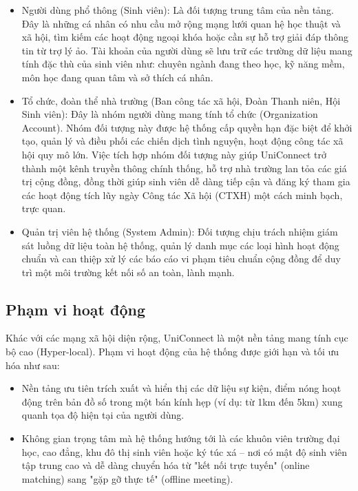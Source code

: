 \begin{itemize}
    \item Người dùng phổ thông (Sinh viên): Là đối tượng trung tâm của nền tảng. Đây là những cá nhân có nhu cầu mở rộng mạng lưới quan hệ học thuật và xã hội, tìm kiếm các hoạt động ngoại khóa hoặc cần sự hỗ trợ giải đáp thông tin từ trợ lý ảo. Tài khoản của người dùng sẽ lưu trữ các trường dữ liệu mang tính đặc thù của sinh viên như: chuyên ngành đang theo học, kỹ năng mềm, môn học đang quan tâm và sở thích cá nhân.

    \item Tổ chức, đoàn thể nhà trường (Ban công tác xã hội, Đoàn Thanh niên, Hội Sinh viên): Đây là nhóm người dùng mang tính tổ chức (Organization Account). Nhóm đối tượng này được hệ thống cấp quyền hạn đặc biệt để khởi tạo, quản lý và điều phối các chiến dịch tình nguyện, hoạt động công tác xã hội quy mô lớn. Việc tích hợp nhóm đối tượng này giúp UniConnect trở thành một kênh truyền thông chính thống, hỗ trợ nhà trường lan tỏa các giá trị cộng đồng, đồng thời giúp sinh viên dễ dàng tiếp cận và đăng ký tham gia các hoạt động tích lũy ngày Công tác Xã hội (CTXH) một cách minh bạch, trực quan.

    \item Quản trị viên hệ thống (System Admin): Đối tượng chịu trách nhiệm giám sát luồng dữ liệu toàn hệ thống, quản lý danh mục các loại hình hoạt động chuẩn và can thiệp xử lý các báo cáo vi phạm tiêu chuẩn cộng đồng để duy trì một môi trường kết nối số an toàn, lành mạnh.
\end{itemize}

\subsection{Phạm vi hoạt động}

Khác với các mạng xã hội diện rộng, UniConnect là một nền tảng mang tính cục bộ cao (Hyper-local). Phạm vi hoạt động của hệ thống được giới hạn và tối ưu hóa như sau\cite{schmidt2011hyperlocal}:

\begin{itemize}
    \item Nền tảng ưu tiên trích xuất và hiển thị các dữ liệu sự kiện, điểm nóng hoạt động trên bản đồ số trong một bán kính hẹp (ví dụ: từ 1km đến 5km) xung quanh tọa độ hiện tại của người dùng.

    \item Không gian trọng tâm mà hệ thống hướng tới là các khuôn viên trường đại học, cao đẳng, khu đô thị sinh viên hoặc ký túc xá – nơi có mật độ sinh viên tập trung cao và dễ dàng chuyển hóa từ "kết nối trực tuyến" (online matching) sang "gặp gỡ thực tế" (offline meeting)\cite{cho2011friendship}.
\end{itemize}

